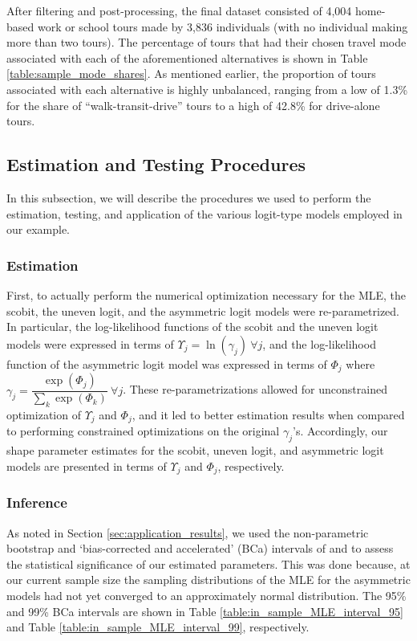 After filtering and post-processing, the final dataset consisted of 4,004 home-based work or school tours made by 3,836 individuals (with no individual making more than two tours). The percentage of tours that had their chosen travel mode associated with each of the aforementioned alternatives is shown in Table \ref{table:sample_mode_shares}. As mentioned earlier, the proportion of tours associated with each alternative is highly unbalanced, ranging from a low of 1.3\% for the share of ``walk-transit-drive'' tours to a high of 42.8\% for drive-alone tours.

\subsection{Estimation and Testing Procedures}
\label{sec:application_procedures}
In this subsection, we will describe the procedures we used to perform the estimation, testing, and application of the various logit-type models employed in our example. 

\subsubsection{Estimation}
\label{sec:application_estimation_procedures}
First, to actually perform the numerical optimization necessary for the MLE, the scobit, the uneven logit, and the asymmetric logit models were re-parametrized. In particular, the log-likelihood functions of the scobit and the uneven logit models were expressed in terms of $ \Upsilon _j = \ln \left( \gamma _j \right) \ \forall j$, and the log-likelihood function of the asymmetric logit model was expressed in terms of $\Phi _j$ where $\gamma _j = \dfrac{\exp \left( \Phi _j \right)}{\sum _k \exp \left( \Phi _k \right)} \ \forall j$. These re-parametrizations allowed for unconstrained optimization of $\Upsilon _j$ and $\Phi _j$, and it led to better estimation results when compared to performing constrained optimizations on the original $\gamma _j$'s. Accordingly, our shape parameter estimates for the scobit, uneven logit, and asymmetric logit models are presented in terms of $\Upsilon _j$ and $\Phi _j$, respectively.

\subsubsection{Inference}
\label{sec:application_inference_procedure}
As noted in Section \ref{sec:application_results}, we used the non-parametric bootstrap and `bias-corrected and accelerated' (BCa) intervals of \citet{efron_introduction_1993} and \citet{diciccio_bootstrap_1996} to assess the statistical significance of our estimated parameters. This was done because, at our current sample size the sampling distributions of the MLE for the asymmetric models had not yet converged to an approximately normal distribution. The 95\% and 99\% BCa intervals are shown in Table \ref{table:in_sample_MLE_interval_95} and Table \ref{table:in_sample_MLE_interval_99}, respectively.

